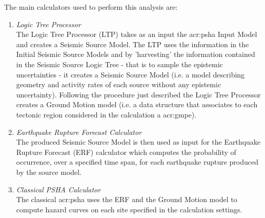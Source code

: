 The main calculators used to perform this analysis are:
\begin{enumerate}
\item \emph{Logic Tree Processor} \hfill \\
The Logic Tree Processor (LTP) takes as an input the \gls{acr:psha} 
Input Model and creates a Seismic Source Model. The LTP uses the 
information in the Initial Seismic Source Models and by 'harvesting' 
the information contained in the Seismic Source Logic Tree - that is 
to sample the epistemic uncertainties - it creates a Seismic Source 
Model (i.e. a model describing geometry and activity rates of each 
source without any epistemic uncertainty). 
%
Following the procedure just described the Logic Tree Processor creates a 
Ground Motion model (i.e. a data structure that associates to each tectonic 
region considered in the calculation a \gls{acr:gmpe}).
%
\item \emph{Earthquake Rupture Forecast Calculator} \hfill \\
The produced Seismic Source Model is then used as input for the Earthquake 
Rupture Forecast (ERF) calculator which computes the probability of occurrence, 
over a specified time span, for each earthquake rupture produced by the source 
model.
\item \emph{Classical PSHA Calculator} \hfill \\
The classical \gls{acr:psha} uses the ERF and the Ground Motion model 
to compute hazard curves on each site specified in the calculation settings.
\end{enumerate} 
%
